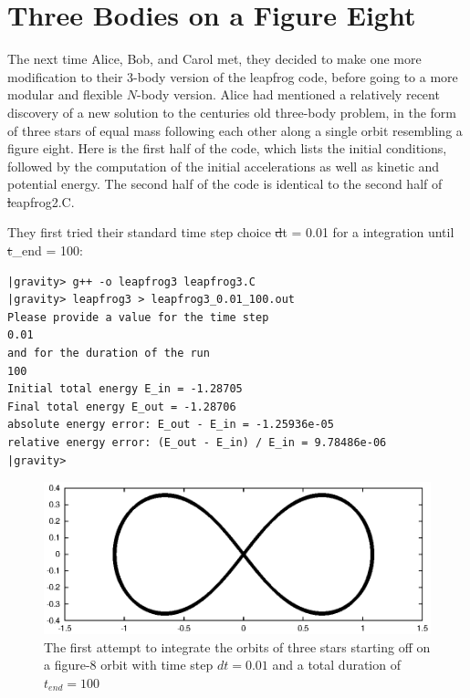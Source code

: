 \section{Three Bodies on a Figure Eight}

The next time Alice, Bob, and Carol met, they decided to make one more
modification to their 3-body version of the leapfrog code, before
going to a more modular and flexible $N$-body version.  Alice had
mentioned a relatively recent discovery of a new solution to the
centuries old three-body problem, in the form of three stars of equal
mass following each other along a single orbit resembling a figure eight.
Here is the first half of the code, which lists the initial conditions,
followed by the computation of the initial accelerations as well as
kinetic and potential energy.  The second half of the code is
identical to the second half of {\st leapfrog2.C}.


They first tried their standard time step choice {\st dt = 0.01} for a
integration until {\st t\_end = 100}:

\begin{small}
\begin{verbatim}
|gravity> g++ -o leapfrog3 leapfrog3.C
|gravity> leapfrog3 > leapfrog3_0.01_100.out
Please provide a value for the time step
0.01
and for the duration of the run
100
Initial total energy E_in = -1.28705
Final total energy E_out = -1.28706
absolute energy error: E_out - E_in = -1.25936e-05
relative energy error: (E_out - E_in) / E_in = 9.78486e-06
|gravity>
\end{verbatim}
\end{small}

\begin{figure}[htb]
\centering
\includegraphics[width=4.5in]{chap5/leapfrog3_0.01_100.ps}
\caption[Three stars on a figure-8 orbit, $dt = 0.01$,
$t_{end} = 100$]
{The first attempt to integrate the orbits of three stars
starting off on a figure-8 orbit with time step $dt = 0.01$ and a
total duration of $t_{end} = 100$}
\label{fig:leap3-0.01-100}
\end{figure}

